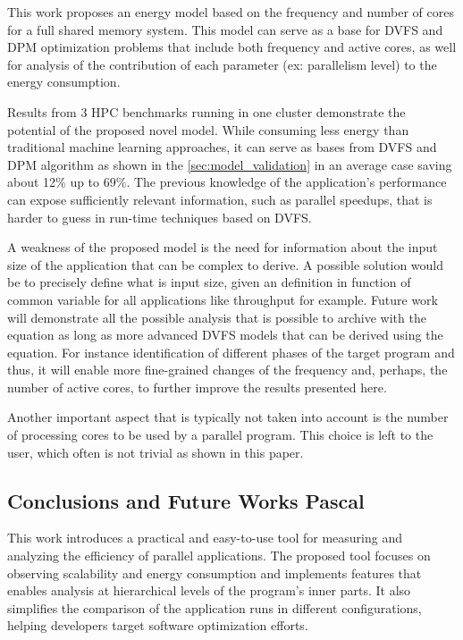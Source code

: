 This work proposes an energy model based on the frequency and number of cores for a full shared memory system. This model can serve as a base for DVFS and DPM optimization problems that include both frequency and active cores, as well for analysis of the contribution of each parameter (ex: parallelism level) to the energy consumption.

Results from 3 HPC benchmarks running in one cluster demonstrate the potential of the proposed novel model. While consuming less energy than traditional machine learning approaches, it can serve as bases from DVFS and DPM algorithm as shown in the \ref{sec:model_validation} in an average case saving about 12\% up to 69\%. The previous knowledge of the application's performance can expose sufficiently relevant information, such as parallel speedups, that is harder to guess in run-time techniques based on DVFS.

A weakness of the proposed model is the need for information about the input size of the application that can be complex to derive. A possible solution would be to precisely define what is input size, given an definition in function of common variable for all applications like throughput for example. Future work will demonstrate all the possible analysis that is possible to archive with the equation as long as more advanced DVFS models that can be derived using the equation. For instance identification of different phases of the target program and thus, it will enable more fine-grained changes of the frequency and, perhaps, the number of active cores, to further improve the results presented here.

Another important aspect that is typically not taken into account is the number of processing cores to be used by a parallel program. This choice is left to the user, which often is not trivial as shown in this paper.


\subsection{Conclusions and Future Works Pascal} \label{sec:conclusions_pascal}

This work introduces a practical and easy-to-use tool for measuring and analyzing the efficiency of parallel applications. The proposed tool focuses on observing scalability and energy consumption and implements features that enables analysis at hierarchical levels of the program's inner parts. It also simplifies the comparison of the application runs in different configurations, helping developers target software optimization efforts.

